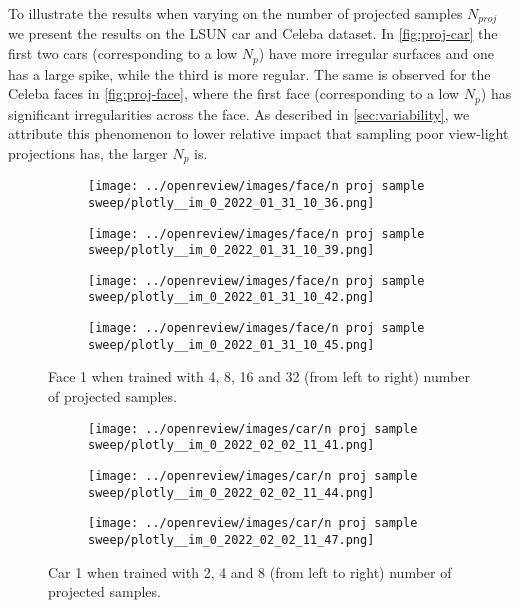 To illustrate the results when varying on the number of projected samples $N_{proj}$ we present the results on the LSUN car and Celeba dataset. In \autoref{fig:proj-car} the first two cars (corresponding to a low $N_p$) have more irregular surfaces and one has a large spike, while the third is more regular. The same is observed for the Celeba faces in \autoref{fig:proj-face}, where the first face (corresponding to a low $N_p$) has significant irregularities across the face. As described in \autoref{sec:variability}, we attribute this phenomenon to lower relative impact that sampling poor view-light projections has, the larger $N_p$ is. 
\begin{figure}[htb!]
    \centering
    \begin{subfigure}{0.24\textwidth}
        \centering
        \texttt{[image: ../openreview/images/face/n proj sample sweep/plotly\_\_im\_0\_2022\_01\_31\_10\_36.png]}
    \end{subfigure}
    \begin{subfigure}{0.24\textwidth}
        \centering
        \texttt{[image: ../openreview/images/face/n proj sample sweep/plotly\_\_im\_0\_2022\_01\_31\_10\_39.png]}
    \end{subfigure}
    \begin{subfigure}{0.24\textwidth}
        \centering
        \texttt{[image: ../openreview/images/face/n proj sample sweep/plotly\_\_im\_0\_2022\_01\_31\_10\_42.png]}
    \end{subfigure}
    \begin{subfigure}{0.24\textwidth}
        \centering
        \texttt{[image: ../openreview/images/face/n proj sample sweep/plotly\_\_im\_0\_2022\_01\_31\_10\_45.png]}
    \end{subfigure}
    \caption{Face 1 when trained with 4, 8, 16 and 32 (from left to right) number of projected samples.}
    \label{fig:proj-face}
\end{figure}


\begin{figure}
    \centering
    \begin{subfigure}{0.32\textwidth}
        \centering
        \texttt{[image: ../openreview/images/car/n proj sample sweep/plotly\_\_im\_0\_2022\_02\_02\_11\_41.png]}
    \end{subfigure}
    \begin{subfigure}{0.32\textwidth}
        \centering
        \texttt{[image: ../openreview/images/car/n proj sample sweep/plotly\_\_im\_0\_2022\_02\_02\_11\_44.png]}
    \end{subfigure}
    \begin{subfigure}{0.32\textwidth}
        \centering
        \texttt{[image: ../openreview/images/car/n proj sample sweep/plotly\_\_im\_0\_2022\_02\_02\_11\_47.png]}
    \end{subfigure}
    \caption{Car 1 when trained with 2, 4 and 8 (from left to right) number of projected samples.}
    \label{fig:proj-car}
\end{figure}
